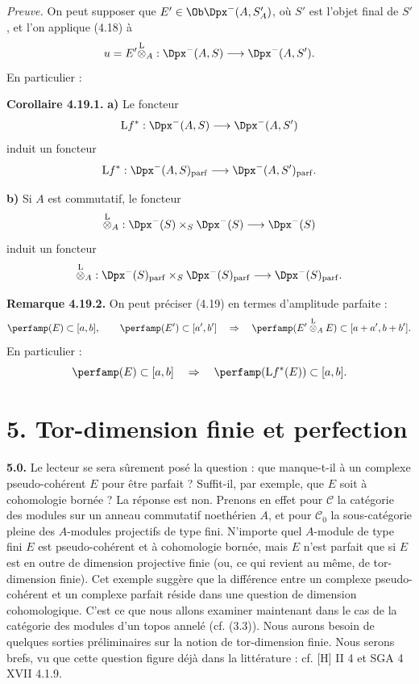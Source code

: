 \documentclass[11pt]{article}
\begin{document}
\emph{Preuve.} On peut supposer que \(E'\in\Ob\Dpx^-(A,S'_A)\), où \(S'\) est l'objet final de \(S'\), et l'on applique (4.18) à
\[
  u=E'\overset{\mathrm L}{\otimes}_A:
  \Dpx^-(A,S)\longrightarrow \Dpx^-(A,S').
\]
En particulier :

\textbf{Corollaire 4.19.1.} \textbf{a)} Le foncteur
\[
  \mathrm L f^*:\Dpx^-(A,S)\longrightarrow \Dpx^-(A,S')
\]
induit un foncteur
\[
  \mathrm L f^*:\Dpx^-(A,S)_{\mathrm{parf}}
  \longrightarrow
  \Dpx^-(A,S')_{\mathrm{parf}}.
\]

\textbf{b)} Si \(A\) est commutatif, le foncteur
\[
  \overset{\mathrm L}{\otimes}_A:
  \Dpx^-(S)\times_S\Dpx^-(S)
  \longrightarrow \Dpx^-(S)
\]
induit un foncteur
\[
  \overset{\mathrm L}{\otimes}_A:
  \Dpx^-(S)_{\mathrm{parf}}\times_S\Dpx^-(S)_{\mathrm{parf}}
  \longrightarrow \Dpx^-(S)_{\mathrm{parf}}.
\]

\textbf{Remarque 4.19.2.} On peut préciser (4.19) en termes d'amplitude parfaite :
\[
  \perfamp(E)\subset[a,b],\qquad
  \perfamp(E')\subset[a',b']
  \quad\Rightarrow\quad
  \perfamp(E'\overset{\mathrm L}{\otimes}_A E)\subset[a+a',b+b'].
\]
En particulier :
\[
  \perfamp(E)\subset[a,b]
  \quad\Rightarrow\quad
  \perfamp(\mathrm L f^*(E))\subset[a,b].
\]

\section*{5. Tor-dimension finie et perfection}

\textbf{5.0.} Le lecteur se sera sûrement posé la question : que manque-t-il à un complexe pseudo-cohérent \(E\) pour être parfait ? Suffit-il, par exemple, que \(E\) soit à cohomologie bornée ? La réponse est non. Prenons en effet pour \(\mathcal C\) la catégorie des modules sur un anneau commutatif noethérien \(A\), et pour \(\mathcal C_0\) la sous-catégorie pleine des \(A\)-modules projectifs de type fini. N'importe quel \(A\)-module de type fini \(E\) est pseudo-cohérent et à cohomologie bornée, mais \(E\) n'est parfait que si \(E\) est en outre de dimension projective finie (ou, ce qui revient au même, de tor-dimension finie). Cet exemple suggère que la différence entre un complexe pseudo-cohérent et un complexe parfait réside dans une question de dimension cohomologique. C'est ce que nous allons examiner maintenant dans le cas de la catégorie des modules d'un topos annelé (cf. (3.3)). Nous aurons besoin de quelques sorties préliminaires sur la notion de tor-dimension finie. Nous serons brefs, vu que cette question figure déjà dans la littérature : cf. [H] II 4 et SGA 4 XVII 4.1.9.
\end{document}
